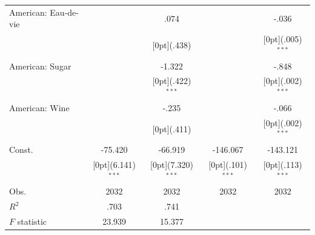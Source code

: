 \documentclass[12pt,a4paper,titlepage]{article}
\begin{document}
{\begin{tabular*}{\textwidth}{@{\extracolsep{\fill}}lcccc}
American: Eau-de-vie &	&	.074 &	&	-.036 \\
&	&	\raisebox{.7ex}[0pt]{\scriptsize (.438)} &	&	\raisebox{.7ex}[0pt]{\scriptsize (.005)$^{***}$} \\
American: Sugar &	&	-1.322 &	&	-.848 \\
&	&	\raisebox{.7ex}[0pt]{\scriptsize (.422)$^{***}$} &	&	\raisebox{.7ex}[0pt]{\scriptsize (.002)$^{***}$} \\
American: Wine &	&	-.235 &	&	-.066 \\
&	&	\raisebox{.7ex}[0pt]{\scriptsize (.411)} &	&	\raisebox{.7ex}[0pt]{\scriptsize (.002)$^{***}$} \\
Const. &	-75.420 &	-66.919 &	-146.067 &	-143.121 \\
&	\raisebox{.7ex}[0pt]{\scriptsize (6.141)$^{***}$} &	\raisebox{.7ex}[0pt]{\scriptsize (7.320)$^{***}$} &	\raisebox{.7ex}[0pt]{\scriptsize (.101)$^{***}$} &	\raisebox{.7ex}[0pt]{\scriptsize (.113)$^{***}$} \\
Obs. &	2032 &	2032 &	2032 &	2032 \\
$ R^2$ &	.703 &	.741 &	&	\\
$ F$ statistic &	23.939 &	15.377 &	&	\\
\hline\hline				
\end{tabular*}%

}
\end{document}
